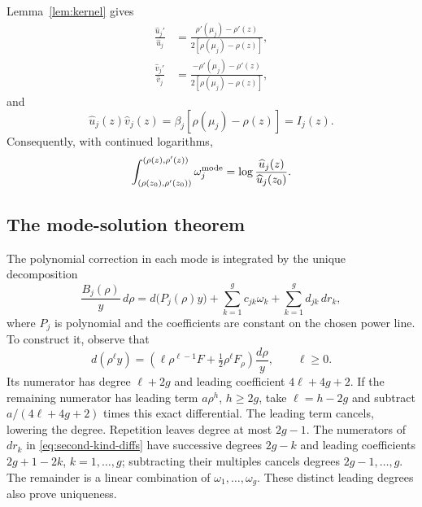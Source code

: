 \documentclass[11pt]{article}
\begin{document}
Lemma~\ref{lem:kernel} gives
\begin{equation}\label{eq:point-factors}
\begin{aligned}
\frac{\widehat u_j'}{\widehat u_j}
&=\frac{\rho'(\mu_j)-\rho'(z)}{2[\rho(\mu_j)-\rho(z)]},\\
\frac{\widehat v_j'}{\widehat v_j}
&=\frac{-\rho'(\mu_j)-\rho'(z)}{2[\rho(\mu_j)-\rho(z)]},
\end{aligned}
\end{equation}
and
\begin{equation}\label{eq:point-product}
\widehat u_j(z)\widehat v_j(z)=\beta_j[\rho(\mu_j)-\rho(z)]=I_j(z).
\end{equation}
Consequently, with continued logarithms,
\begin{equation}\label{eq:third-kind-integral}
\int_{(\rho(z_0),\rho'(z_0))}^{(\rho(z),\rho'(z))}\omega_j^{\rm mode}
=\log\frac{\widehat u_j(z)}{\widehat u_j(z_0)}.
\end{equation}
\subsection{The mode-solution theorem}\label{sec:mode-solutions}

The polynomial correction in each mode is integrated by the unique decomposition
\begin{equation}\label{eq:B-reduction}
\frac{B_j(\rho)}y\,d\rho=d\bigl(P_j(\rho)y\bigr)
+\sum_{k=1}^g c_{jk}\omega_k+\sum_{k=1}^g d_{jk}\,dr_k,
\end{equation}
where $P_j$ is polynomial and the coefficients are constant on the chosen power line. To construct it, observe that
\begin{equation}\label{eq:exact-polynomial-differential}
d(\rho^\ell y)=\left(\ell\rho^{\ell-1}F+\tfrac12\rho^\ell F_\rho\right)\frac{d\rho}{y},\qquad \ell\ge0.
\end{equation}
Its numerator has degree $\ell+2g$ and leading coefficient $4\ell+4g+2$. If the remaining numerator has leading term $a\rho^h$, $h\ge2g$, take $\ell=h-2g$ and subtract $a/(4\ell+4g+2)$ times this exact differential. The leading term cancels, lowering the degree. Repetition leaves degree at most $2g-1$. The numerators of $dr_k$ in \eqref{eq:second-kind-diffs} have successive degrees $2g-k$ and leading coefficients $2g+1-2k$, $k=1,\ldots,g$; subtracting their multiples cancels degrees $2g-1,\ldots,g$. The remainder is a linear combination of $\omega_1,\ldots,\omega_g$. These distinct leading degrees also prove uniqueness.
\end{document}
